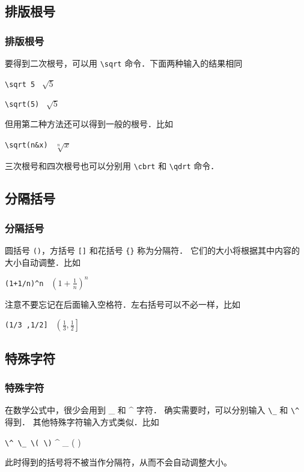 \documentclass[12pt,notheorems,xcolor={rgb}]{beamer}
\let\lst=\lstinline
\newenvironment{framex}{\begin{frame}[fragile=singleslide,environment=framex]}{\end{frame}}
\def\bold#1{\textcolor{accent2}{#1}}
\begin{document}
\subsection{排版根号}

\begin{framex}
\frametitle{排版根号}
要得到二次根号，可以用 \lst!\sqrt! 命令．下面两种输入的结果相同
\begin{exampleh}
\lst!\sqrt 5 ! \tcblower $\sqrt{5}$
\end{exampleh}
\begin{exampleh}
\lst!\sqrt(5) ! \tcblower $\sqrt{5}$
\end{exampleh}
但用第二种方法还可以得到一般的根号．比如
\begin{exampleh}
\lst!\sqrt(n&x) ! \tcblower $\sqrt[n]{x}$
\end{exampleh}
三次根号和四次根号也可以分别用 \lst!\cbrt! 和 \lst!\qdrt! 命令．
\end{framex}

\subsection{分隔括号}

\begin{framex}
\frametitle{分隔括号}
圆括号 \lst!()!，方括号 \lst![]! 和花括号 \lst!{}! 称为\bold{分隔符}．
它们的大小将根据其中内容的大小自动调整．比如
\begin{exampleh}
\lst!(1+1/n)^n ! \tcblower $\left(1+\frac1n\right)^n$
\end{exampleh}
注意不要忘记在后面输入空格符．左右括号可以不必一样，比如
\begin{exampleh}
\lst!(1/3 ,1/2] ! \tcblower $\left(\frac13,\frac12\right]$
\end{exampleh}
\end{framex}

\subsection{特殊字符}

\begin{framex}
\frametitle{特殊字符}
在数学公式中，很少会用到 \_ 和 \^{} 字符．
确实需要时，可以分别输入  \lst!\_! 和 \lst!\^! 得到．
其他特殊字符输入方式类似．比如
\begin{exampleh}
\lst!\^ \_ \( \)! \tcblower \^{} \_ ( )
\end{exampleh}
此时得到的括号将不被当作分隔符，从而不会自动调整大小。
\end{framex}
\end{document}
